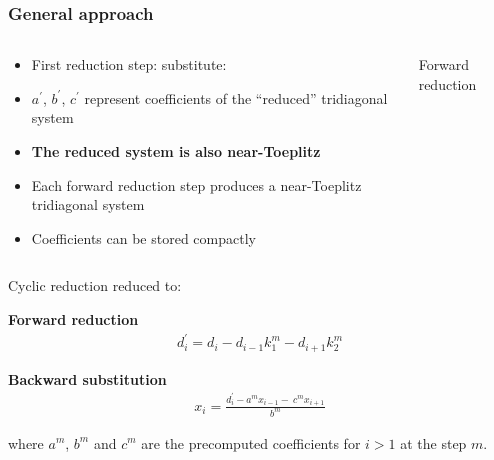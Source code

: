 \begin{frame}
\frametitle{General approach}
\begin{columns}
\begin{column}{0.5\textwidth}
\begin{itemize}
\item {First reduction step: substitute:
    }
\item $a^\prime$, $b^\prime$, $c^\prime$
    represent coefficients of the ``reduced'' tridiagonal system
\item \textbf{The reduced system is also near-Toeplitz}
\item Each forward reduction step produces a near-Toeplitz
    tridiagonal system
\item Coefficients can be stored compactly
\end{itemize}
\end{column}
\begin{column}{0.5\textwidth}
\centering
Forward reduction
\end{column}
\end{columns}
\end{frame}

\begin{frame}
Cyclic reduction reduced to:

\vspace{1cm}

\textbf{Forward reduction}
\begin{align*}
d^{\prime}_i = d_i - d_{i-1}k_1^{m}  - d_{i+1}k_2^{m}
\end{align*}

\textbf{Backward substitution}
\begin{align*}
x_i = \frac{d^{\prime}_i - a^mx_{i-1} - \
    c^{m}x_{i+1}}{b^m}
\end{align*}

where $a^m$, $b^m$ and $c^m$ are the precomputed
coefficients for $i>1$ at the step $m$.
\end{frame}
